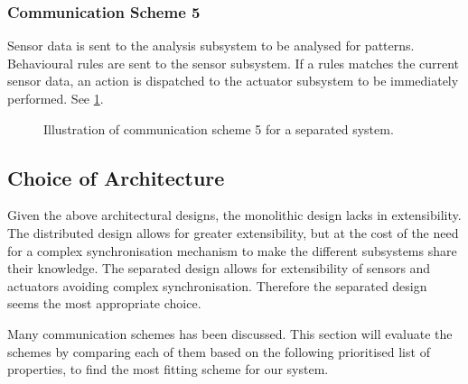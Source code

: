 \subsubsection{Communication Scheme 5}

Sensor data is sent to the analysis subsystem to be analysed for patterns. Behavioural rules are sent to the sensor subsystem. If a rules matches the current sensor data, an action is dispatched to the actuator subsystem to be immediately performed. See \cref{fig:separated_subsystems_scheme5}.

\begin{figure}[htbp]
\centering
{}
\caption[Communication scheme 5]{Illustration of communication scheme 5 for a separated system.}\label{fig:separated_subsystems_scheme5}
\end{figure}

\subsection{Choice of Architecture}

Given the above architectural designs, the monolithic design lacks in extensibility. The distributed design allows for greater extensibility, but at the cost of the need for a complex synchronisation mechanism to make the different subsystems share their knowledge. The separated design allows for extensibility of sensors and actuators avoiding complex synchronisation. Therefore the separated design seems the most appropriate choice.

Many communication schemes has been discussed. This section will evaluate the schemes by comparing each of them based on the following prioritised list of properties, to find the most fitting scheme for our system.

